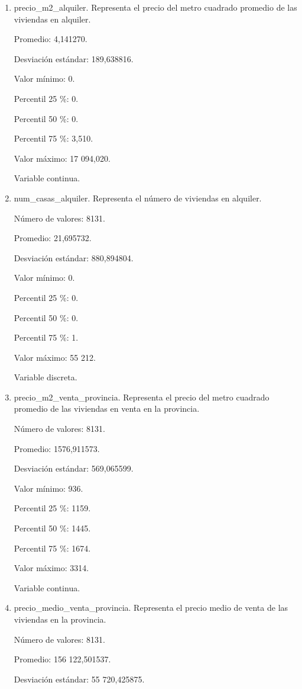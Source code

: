 \begin{enumerate}
	\item precio\_m2\_alquiler. Representa el precio del metro cuadrado promedio de las viviendas en alquiler.
	
	Promedio: 4,141270.
	
	Desviación estándar: 189,638816.
	
	Valor mínimo: 0.
	
	Percentil 25 \%: 0.
	
	Percentil 50 \%: 0.
	
	Percentil 75 \%: 3,510.
	
	Valor máximo: 17 094,020.
	
	Variable continua.

	\item num\_casas\_alquiler. Representa el número de viviendas en alquiler.
	
	Número de valores: 8131.
	
	Promedio: 21,695732.
	
	Desviación estándar: 880,894804.
	
	Valor mínimo: 0.
	
	Percentil 25 \%: 0.
	
	Percentil 50 \%: 0.
	
	Percentil 75 \%: 1.
	
	Valor máximo: 55 212.
	
	Variable discreta.

	\item precio\_m2\_venta\_provincia. Representa el precio del metro cuadrado promedio de las viviendas en venta en la provincia.
	
	Número de valores: 8131.
	
	Promedio: 1576,911573.
	
	Desviación estándar: 569,065599.
	
	Valor mínimo: 936.
	
	Percentil 25 \%: 1159.
	
	Percentil 50 \%: 1445.
	
	Percentil 75 \%: 1674.
	
	Valor máximo: 3314.
	
	Variable continua.

	\item precio\_medio\_venta\_provincia. Representa el precio medio de venta de las viviendas en la provincia.
	
	Número de valores: 8131.
	
	Promedio: 156 122,501537.
	
	Desviación estándar: 55 720,425875.
	

\end{enumerate}

